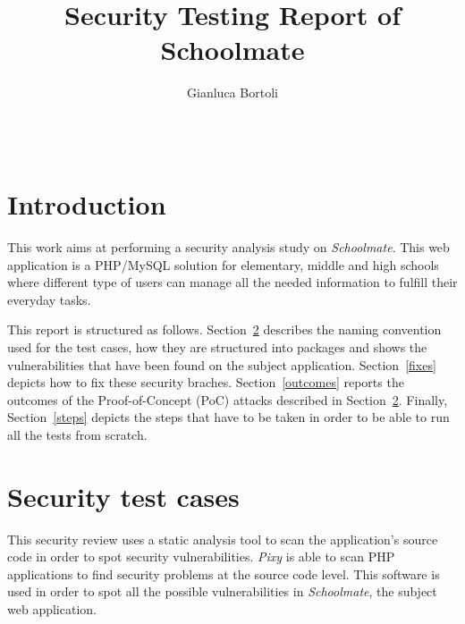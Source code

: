 \documentclass{sig-alternate-05-2015}
\begin{document}
\title{Security Testing Report of Schoolmate}

\author{
    Gianluca Bortoli\\
           \\
           \\
}
\maketitle


\section{Introduction}
This work aims at performing a security analysis study on \emph{Schoolmate}.
This web application is a PHP/MySQL solution for elementary,
middle and high schools where different type of users can manage all the needed
information to fulfill their everyday tasks.

This report is structured as follows. Section~\ref{tests} describes the naming
convention used for the test cases, how they are structured into packages and shows
the vulnerabilities that have been found on the subject application.
Section~\ref{fixes} depicts how to fix these security braches. Section~\ref{outcomes}
reports the outcomes of the Proof-of-Concept (PoC) attacks described in Section~\ref{tests}.
Finally, Section~\ref{steps} depicts the steps that have to be taken in order to
be able to run all the tests from scratch.


\section{Security test cases}\label{tests}
This security review uses a static analysis tool to scan the application's source code
in order to spot security vulnerabilities.
\emph{Pixy} is able to scan PHP applications to find security problems at the source code level.
This software is used in order to spot all the possible vulnerabilities in \emph{Schoolmate},
the subject web application.
\end{document}
